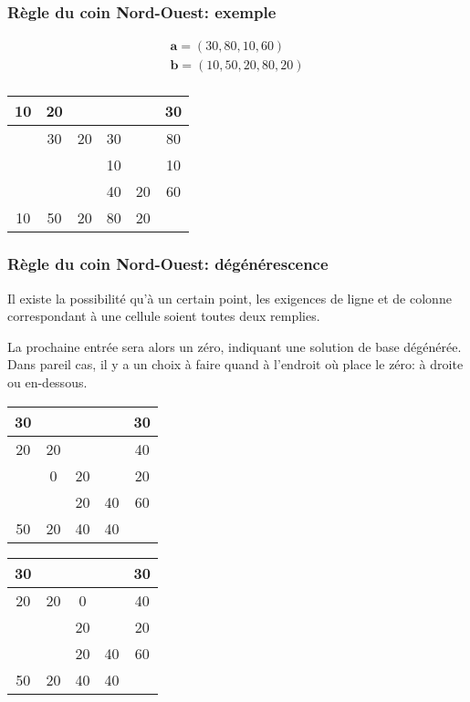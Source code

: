 \documentclass[usepdftitle=false]{beamer}
\def\ba{\boldsymbol{a}}
\def\bb{\boldsymbol{b}}
\begin{document}
\begin{frame}
\frametitle{Règle du coin Nord-Ouest: exemple}

\[
\begin{matrix}
\ba = (30, 80, 10, 60) \\
\bb = (10, 50, 20, 80, 20) \\
\end{matrix}
\]

\begin{center}
\begin{tabular}{|c|c|c|c|c|c}
\hline
10 & 20 & & & & 30 \\
\hline
& 30 & 20 & 30 & & 80 \\
\hline
& & & 10 & & 10 \\
\hline
& & & 40 & 20 & 60 \\
\hline
10 & 50 & 20 & 80 & 20 & \\
\end{tabular}
\end{center}

\end{frame}

\begin{frame}
\frametitle{Règle du coin Nord-Ouest: dégénérescence}

Il existe la possibilité qu'à un certain point, les exigences de ligne et de colonne correspondant à une cellule soient toutes deux remplies.

\mbox{}

La prochaine entrée sera alors un zéro, indiquant une solution de base dégénérée. Dans pareil cas, il y a un choix à faire quand à l'endroit où place le zéro: à droite ou en-dessous.

\mbox{}

\begin{center}
\begin{minipage}{.4\linewidth}
\begin{tabular}{|c|c|c|c|c}
\hline
30 & & & & 30 \\
\hline
20 & 20 & & & 40 \\
\hline
& 0 & 20 & & 20 \\
\hline
& & 20 & 40 & 60 \\
\hline
50 & 20 & 40 & 40 & \\
\end{tabular}
\end{minipage}
\begin{minipage}{.4\linewidth}
\begin{tabular}{|c|c|c|c|c}
\hline
30 & & & & 30 \\
\hline
20 & 20 & 0 & & 40 \\
\hline
& & 20 & & 20 \\
\hline
& & 20 & 40 & 60 \\
\hline
50 & 20 & 40 & 40 & \\
\end{tabular}
\end{minipage}
\end{center}

\end{frame}
\end{document}
